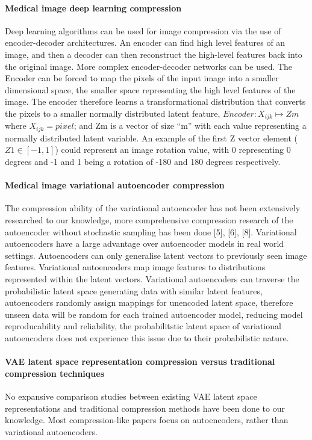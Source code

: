 \documentclass[review]{elsarticle}
\begin{document}
\paragraph{Medical image deep learning compression} Deep learning algorithms can be used for image compression via the use of encoder-decoder architectures. An encoder can find high level features of an image, and then a decoder can then reconstruct the high-level features back into the original image. More complex encoder-decoder networks can be used. The Encoder can be forced to map the pixels of the input image into a smaller dimensional space, the smaller space representing the high level features of the image. The encoder therefore learns a transformational distribution that converts the pixels to a smaller normally distributed latent feature, $Encoder: X_{ijk} \mapsto Z{m}$ where $X_{ijk} = pixel$; and Z{m} is a vector of size ``m'' with each value representing a normally distributed latent variable. An example of the first Z vector element ($Z{1}\in [-1, 1]$) could represent an image rotation value, with 0 representing 0 degrees and -1 and 1 being a rotation of -180 and 180 degrees respectively.

\paragraph{Medical image variational autoencoder compression} The compression ability of the variational autoencoder has not been extensively researched to our knowledge, more comprehensive compression research of the autoencoder without stochastic sampling has been done [5], [6], [8]. Variational autoencoders have a large advantage over autoencoder models in real world settings. Autoencoders can only generalise latent vectors to previously seen image features. Variational autoencoders map image features to distributions represented within the latent vectors. Variational autoencoders can traverse the probabilistic latent space generating data with similar latent features, autoencoders randomly assign mappings for unencoded latent space, therefore unseen data will be random for each trained autoencoder model, reducing model reproducability and reliability, the probabilitstic latent space of variational autoencoders does not experience this issue due to their probabilistic nature.

\paragraph{VAE latent space representation compression versus traditional compression techniques} No expansive comparison studies between existing VAE latent space representations and traditional compression methods have been done to our knowledge. Most compression-like papers focus on autoencoders, rather than variational autoencoders.
\end{document}
